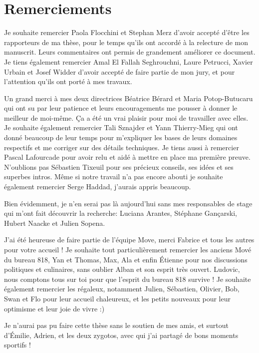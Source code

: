 
\chapter*{Remerciements}

\vspace{-1ex}
Je souhaite remercier Paola Flocchini et Stephan Merz d'avoir accepté d'être les rapporteurs de ma thèse, 
pour le temps qu’ils ont accordé à la relecture de mon manuscrit. Leurs commentaires ont permis de grandement améliorer ce document.
Je tiens également remercier Amal El Fallah Seghrouchni, Laure Petrucci, Xavier Urbain et Josef Widder d'avoir accepté de faire 
partie de mon jury, et pour l'attention qu'ils ont porté à mes travaux.


Un grand merci à mes deux directrices Béatrice Bérard et Maria Potop-Butucaru qui ont su par leur patience et leurs encouragements
me pousser  à donner le meilleur de moi-même. Ça a été un vrai plaisir pour moi de travailler avec elles.
Je souhaite également remercier Tali Sznajder et Yann Thierry-Mieg qui ont donné beaucoup de leur temps pour m'expliquer les bases de leurs domaines respectifs et me corriger sur des détails techniques.
Je tiens aussi à remercier Pascal Lafourcade pour avoir relu et aidé à mettre en place ma première preuve. N'oublions pas Sébastien Tixeuil pour 
ses précieux conseils, ses idées et ses superbes intros. Même si notre travail n'a pas encore abouti je souhaite également remercier Serge Haddad, j'aurais appris beaucoup. 


Bien évidemment, je n’en serai pas là aujourd’hui sans mes responsables de stage qui m'ont fait découvrir la recherche: 
Luciana Arantes, Stéphane Gançarski, Hubert Naacke et Julien Sopena. 

J'ai été heureuse de faire partie de l'équipe Move, merci Fabrice et tous les autres pour votre accueil !
Je souhaite tout particulièrement remercier les anciens Mové du bureau 818, Yan et Thomas, Max, Ala et enfin \'Etienne pour nos discussions politiques et culinaires, sans oublier Alban et son esprit très ouvert.
Ludovic, nous comptons tous sur toi pour que l'esprit du bureau 818 survive !
Je souhaite également remercier les régaleux, notamment Julien, Sébastien, Olivier, Bob, Swan et Flo pour leur accueil chaleureux, et les petits nouveaux pour leur optimisme et leur joie de vivre :) 
 
Je n'aurai pas pu faire cette thèse sans le soutien de mes amis, et surtout d'\'Emilie, Adrien, et les deux zygotos, avec qui j'ai partagé de bons moments sportifs !


